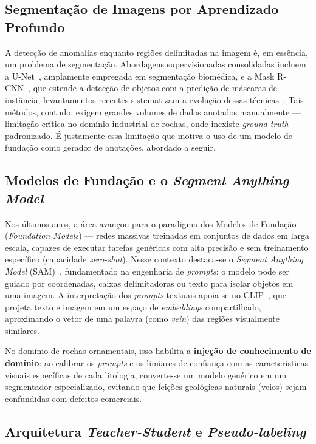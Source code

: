 \documentclass[12pt]{article}
\begin{document}
\subsection{Segmentação de Imagens por Aprendizado Profundo}

A detecção de anomalias enquanto regiões delimitadas na imagem é, em essência, um problema de segmentação. Abordagens supervisionadas consolidadas incluem a U-Net~\cite{unet_ronneberger2015}, amplamente empregada em segmentação biomédica, e a Mask R-CNN~\cite{maskrcnn_he2017}, que estende a detecção de objetos com a predição de máscaras de instância; levantamentos recentes sistematizam a evolução dessas técnicas~\cite{segsurvey_minaee2021}. Tais métodos, contudo, exigem grandes volumes de dados anotados manualmente --- limitação crítica no domínio industrial de rochas, onde inexiste \textit{ground truth} padronizado. É justamente essa limitação que motiva o uso de um modelo de fundação como gerador de anotações, abordado a seguir.

\subsection{Modelos de Fundação e o \textit{Segment Anything Model}}

Nos últimos anos, a área avançou para o paradigma dos Modelos de Fundação (\textit{Foundation Models}) --- redes massivas treinadas em conjuntos de dados em larga escala, capazes de executar tarefas genéricas com alta precisão e sem treinamento específico (capacidade \textit{zero-shot}). Nesse contexto destaca-se o \textit{Segment Anything Model} (SAM)~\cite{sam_kirillov2023}, fundamentado na engenharia de \textit{prompts}: o modelo pode ser guiado por coordenadas, caixas delimitadoras ou texto para isolar objetos em uma imagem. A interpretação dos \textit{prompts} textuais apoia-se no CLIP~\cite{clip_radford2021}, que projeta texto e imagem em um espaço de \textit{embeddings} compartilhado, aproximando o vetor de uma palavra (como \textit{vein}) das regiões visualmente similares.

No domínio de rochas ornamentais, isso habilita a \textbf{injeção de conhecimento de domínio}: ao calibrar os \textit{prompts} e os limiares de confiança com as características visuais específicas de cada litologia, converte-se um modelo genérico em um segmentador especializado, evitando que feições geológicas naturais (veios) sejam confundidas com defeitos comerciais.

\subsection{Arquitetura \textit{Teacher-Student} e \textit{Pseudo-labeling}}
\end{document}
